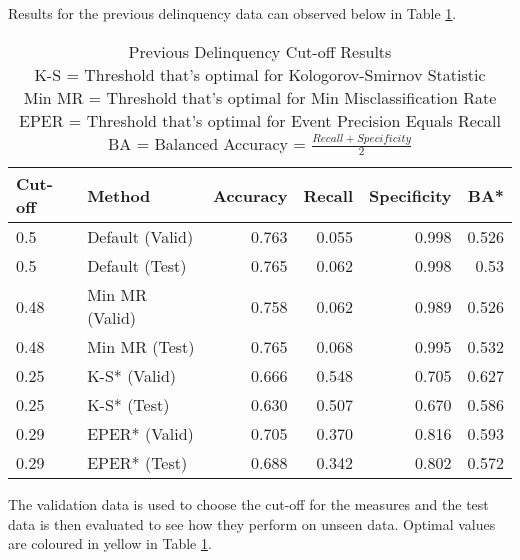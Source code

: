 Results for the previous delinquency data can observed below in Table \ref{table:DelinquencyModelCutoff}. 	

\begin{table}[H]
	\centering
\small
		\begin{tabular}{|l|l|r|r|r|r|}
			\hline
			\textbf{Cut-off} & \textbf{Method}       & \textbf{Accuracy} & \textbf{Recall} & \textbf{Specificity}  & \textbf{BA*} \\ \hline
			0.5              & Default (Valid)       & 0.763             & 0.055           & 0.998                  & 0.526    \\
			0.5              & Default (Test)        & 0.765             & 0.062           & 0.998                    & 0.53  \\ \hline
			0.48             & Min MR (Valid)        & 0.758             & 0.062           & 0.989                       & 0.526 \\
			0.48             & Min MR (Test)         & \cellcolor{yellow!25}0.765         & 0.068                & \cellcolor{yellow!25}0.995    & 0.532   \\ \hline
			0.25             & K-S* (Valid) 		     & 0.666             & 0.548           & 0.705                    & 0.627  \\
			0.25             & K-S* (Test)  		     & 0.630             & \cellcolor{yellow!25}0.507                          & 0.670  & \cellcolor{yellow!25}0.586     \\ \hline
			0.29             & EPER* (Valid)          & 0.705             & 0.370           & 0.816                    & 0.593   \\
			0.29             & EPER* (Test)           & 0.688             & 0.342           & 0.802                 & 0.572    \\ \hline
		\end{tabular}
	\caption{Previous Delinquency Cut-off Results 
			\\ K-S = Threshold that's optimal for Kologorov-Smirnov Statistic
			\\ Min MR = Threshold that's optimal for Min Misclassification Rate
			\\ EPER = Threshold that's optimal for Event Precision Equals Recall
			\\ BA = Balanced Accuracy = $\frac{Recall + Specificity }{2}$
		}
	\label{table:DelinquencyModelCutoff}
\end{table}

The validation data is used to choose the cut-off for the measures and the test data is then evaluated to see how they perform on unseen data. Optimal values are coloured in yellow in Table \ref{table:DelinquencyModelCutoff}.

